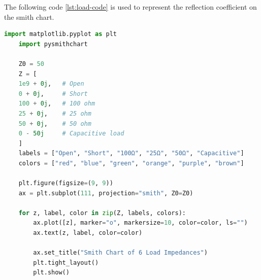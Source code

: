 \newpage
The following code \ref{lst:load-code} is used to represent the reflection coefficient on the smith chart.
\begin{lstlisting}[style=mystyle, language=Python, label={lst:smith-code}]
	import matplotlib.pyplot as plt
	import pysmithchart
	
	Z0 = 50
	Z = [
	1e9 + 0j,   # Open
	0 + 0j,     # Short
	100 + 0j,   # 100 ohm
	25 + 0j,    # 25 ohm
	50 + 0j,    # 50 ohm
	0 - 50j     # Capacitive load
	]
	labels = ["Open", "Short", "100Ω", "25Ω", "50Ω", "Capacitive"]
	colors = ["red", "blue", "green", "orange", "purple", "brown"]
	
	plt.figure(figsize=(9, 9))
	ax = plt.subplot(111, projection="smith", Z0=Z0)
	
	for z, label, color in zip(Z, labels, colors):
		ax.plot([z], marker="o", markersize=10, color=color, ls="")
		ax.text(z, label, color=color)
		
		ax.set_title("Smith Chart of 6 Load Impedances")
		plt.tight_layout()
		plt.show()
\end{lstlisting}

\newpage
